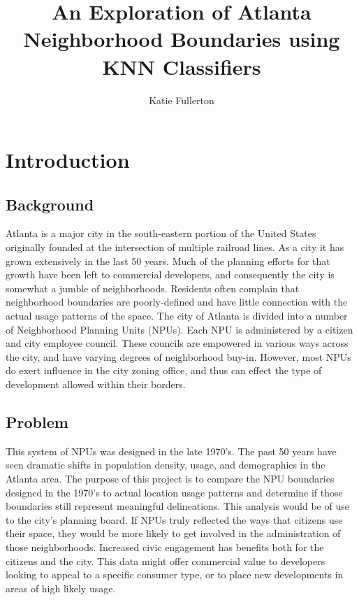 \documentclass[11pt]{amsart}
\title{An Exploration of Atlanta Neighborhood Boundaries using KNN Classifiers}
\author{Katie Fullerton}
\begin{document}
\maketitle
\section{Introduction}
\subsection{Background}
Atlanta is a major city in the south-eastern portion of the United States originally founded at the intersection of multiple railroad lines. As a city it has grown extensively in the last 50 years. Much of the planning efforts for that growth have been left to commercial developers, and consequently the city is somewhat a jumble of neighborhoods. Residents often complain that neighborhood boundaries are poorly-defined and have little connection with the actual usage patterns of the space. 
The city of Atlanta is divided into a number of Neighborhood Planning Units (NPUs). Each NPU is administered by a citizen and city employee council. These councils are empowered in various ways across the city, and have varying degrees of neighborhood buy-in. However, most NPUs do exert influence in the city zoning office, and thus can effect the type of development allowed within their borders. 
\subsection{Problem}
This system of NPUs was designed in the late 1970's. The past 50 years have seen dramatic shifts in population density, usage, and demographics in the Atlanta area. The purpose of this project is to compare the NPU boundaries designed in the 1970's to actual location usage patterns and determine if those boundaries still represent meaningful delineations.
This analysis would be of use to the city's planning board. If NPUs truly reflected the ways that citizens use their space, they would be more likely to get involved in the administration of those neighborhoods. Increased civic engagement has benefits both for the citizens and the city. This data might offer commercial value to developers looking to appeal to a specific consumer type, or to place new developments in areas of high likely usage.  
\end{document}

